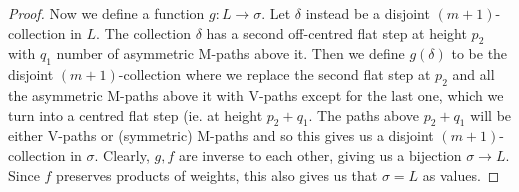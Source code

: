 \documentclass[11pt]{article}
\theoremstyle{mythm}
\begin{document}
\begin{proof}
Now we define a function $g:L\to\sigma$. Let $\delta$ instead be a disjoint $(m+1)$-collection in $L$. The collection $\delta$ has a second off-centred flat step at height $p_2$ with $q_1$ number of asymmetric M-paths above it. Then we define $g(\delta)$ to be the disjoint $(m+1)$-collection where we replace the second flat step at $p_2$ and all the asymmetric M-paths above it with V-paths except for the last one, which we turn into a centred flat step (ie. at height $p_2+q_1$. The paths above $p_2+q_1$ will be either V-paths or (symmetric) M-paths and so this gives us a disjoint $(m+1)$-collection in $\sigma$. Clearly, $g,f$ are inverse to each other, giving us a bijection $\sigma\to L$. Since $f$ preserves products of weights, this also gives us that $\sigma = L$ as values.
\end{proof}
\end{document}
